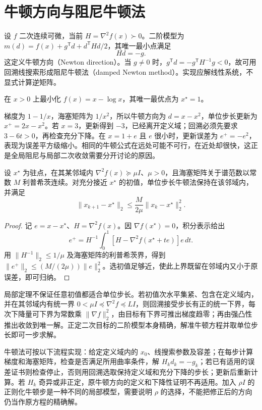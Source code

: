\section{牛顿方向与阻尼牛顿法}

设 $f$ 二次连续可微，当前 $H=\nabla^2f(x)\succ0$。二阶模型为 $m(d)=f(x)+g^{\mathsf T}d+d^{\mathsf T}Hd/2$，其唯一最小点满足
\begin{equation}
 Hd=-g.
 \label{eq:co-newton-direction}
\end{equation}
这定义牛顿方向（Newton direction）。当 $g\ne0$ 时，$g^{\mathsf T}d=-g^{\mathsf T}H^{-1}g<0$，故可用回溯线搜索形成阻尼牛顿法（damped Newton method）。实现应解线性系统，不显式计算逆矩阵。

\begin{example}[牛顿步为何需要阻尼]
在 $x>0$ 上最小化 $f(x)=x-\log x$，其唯一最优点为 $x^\star=1$。
\end{example}
\begin{solve}
梯度为 $1-1/x$，海塞矩阵为 $1/x^2$，所以牛顿方向为 $d=x-x^2$，单位步长更新为 $x^+=2x-x^2$。若 $x=3$，更新得到 $-3$，已经离开定义域；回溯必须先要求 $3-6t>0$，再检查充分下降。在 $x=1+e$ 且 $e$ 很小时，更新误差为 $e^+=-e^2$，表现为误差平方级缩小。相同的牛顿公式在远处可能不可行，在近处却很快，这正是全局阻尼与局部二次收敛需要分开讨论的原因。
\end{solve}

\begin{theorem}[局部二次收敛]
设 $x^\star$ 为驻点，在其某邻域内 $\nabla^2f(x)\succeq\mu I$、$\mu>0$，且海塞矩阵关于谱范数以常数 $M$ 利普希茨连续。对充分接近 $x^\star$ 的初值，单位步长牛顿法保持在该邻域内，并满足
\[
 \|x_{k+1}-x^\star\|_2\leq\frac{M}{2\mu}\|x_k-x^\star\|_2^2.
\]
\end{theorem}
\begin{proof}
记 $e=x-x^\star$、$H=\nabla^2f(x)$。因 $\nabla f(x^\star)=0$，积分表示给出
\[
 e^+=H^{-1}\int_0^1[H-\nabla^2f(x^\star+te)]e\,dt.
\]
用 $\|H^{-1}\|_2\leq1/\mu$ 及海塞矩阵的利普希茨界，得到 $\|e^+\|_2\leq(M/(2\mu))\|e\|_2^2$。选初值足够近，使此上界既留在邻域内又小于原误差，即可归纳。
\end{proof}

局部定理不保证任意初值都适合单位步长。若初值次水平集紧、包含在定义域内，并在其邻域内有统一界 $0<\mu I\preceq\nabla^2f\preceq LI$，则回溯接受步长有正的统一下界，每次下降量可下界为常数乘 $\|\nabla f\|_2^2$，由目标有下界可推出梯度趋零；再由强凸性推出收敛到唯一解。正定二次目标的二阶模型本身精确，解准牛顿方程并取单位步长即可一步求解。

牛顿法可按以下流程实现：给定定义域内的 $x_0$、线搜索参数及容差；在每步计算梯度和海塞矩阵，检查是否满足所用曲率条件，解 $H_kd_k=-g_k$；若已有适用的误差证书则检查停止，否则用回溯选取保持定义域和充分下降的步长；更新后重新计算。若 $H_k$ 奇异或非正定，原牛顿方向的定义和下降性证明不再适用。加入 $\rho I$ 的正则化牛顿步是一种不同的局部模型，需要说明 $\rho$ 的选择，不能把修正后的方向仍当作原方程的精确解。

